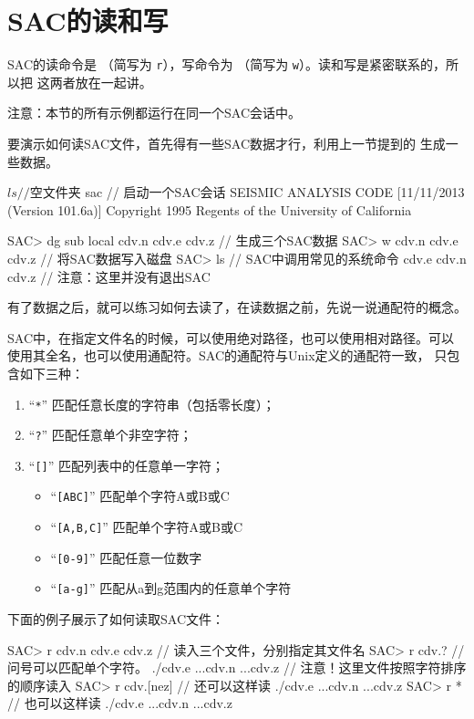 \section{SAC的读和写}
\label{sec:read-and-write}
SAC的读命令是 （简写为 \texttt{r}），写命令为
（简写为 \texttt{w}）。读和写是紧密联系的，所以把
这两者放在一起讲。

注意：本节的所有示例都运行在同一个SAC会话中。

要演示如何读SAC文件，首先得有一些SAC数据才行，利用上一节提到的
 生成一些数据。
\begin{SACCode}
$ ls                // 空文件夹
$ sac               // 启动一个SAC会话
 SEISMIC ANALYSIS CODE [11/11/2013 (Version 101.6a)]
 Copyright 1995 Regents of the University of California

SAC> dg sub local cdv.n cdv.e cdv.z     // 生成三个SAC数据
SAC> w cdv.n cdv.e cdv.z                // 将SAC数据写入磁盘
SAC> ls                                 // SAC中调用常见的系统命令
cdv.e  cdv.n  cdv.z
                                        // 注意：这里并没有退出SAC
\end{SACCode}

有了数据之后，就可以练习如何去读了，在读数据之前，先说一说通配符的概念。

SAC中，在指定文件名的时候，可以使用绝对路径，也可以使用相对路径。可以
使用其全名，也可以使用通配符。SAC的通配符与Unix定义的通配符一致，
只包含如下三种：
\begin{enumerate}
\item ``\texttt{*}'' 匹配任意长度的字符串（包括零长度）；
\item ``\texttt{?}'' 匹配任意单个非空字符；
\item ``\texttt{[]}'' 匹配列表中的任意单一字符；
    \begin{itemize}
        \item ``\texttt{[ABC]}'' 匹配单个字符A或B或C
        \item ``\texttt{[A,B,C]}'' 匹配单个字符A或B或C
        \item ``\texttt{[0-9]}'' 匹配任意一位数字
        \item ``\texttt{[a-g]}'' 匹配从a到g范围内的任意单个字符
    \end{itemize}
\end{enumerate}

下面的例子展示了如何读取SAC文件：
\begin{SACCode}
SAC> r cdv.n cdv.e cdv.z    // 读入三个文件，分别指定其文件名
SAC> r cdv.?                // 问号可以匹配单个字符。
./cdv.e ...cdv.n ...cdv.z   // 注意！这里文件按照字符排序的顺序读入
SAC> r cdv.[nez]            // 还可以这样读
./cdv.e ...cdv.n ...cdv.z
SAC> r *                    // 也可以这样读
./cdv.e ...cdv.n ...cdv.z
\end{SACCode}


